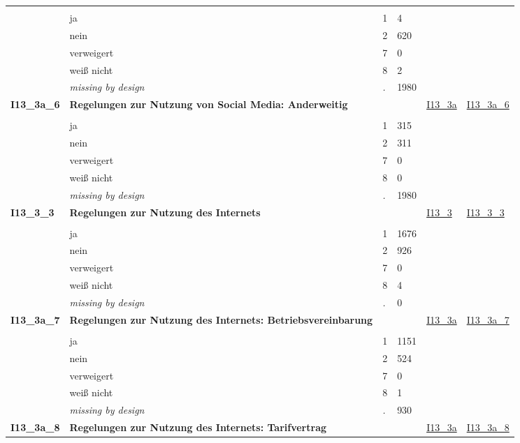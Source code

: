 \begin{longtable}{| L{2.45cm} | L{6cm} | C{1.5cm} | R{1cm} | C{2.25cm} | C{2.25cm} |}
   &  &  &  &  &  \\ 
   & ja & 1 & 4 &  &  \\ 
   & nein & 2 & 620 &  &  \\ 
   & verweigert & 7 & 0 &  &  \\ 
   & weiß nicht & 8 & 2 &  &  \\ 
   & \textit{missing by design} & \textit{.} & 1980 &  &  \\ 
   \midrule
\textbf{I13\_3a\_6}\label{var:I13:3a:6} & \textbf{Regelungen zur Nutzung von Social Media: Anderweitig} &  &  & \hyperref[I13:3a]{I13\_3a} & \hyperref[var:suf:I13:3a:6]{I13\_3a\_6} \\ 
   &  &  &  &  &  \\ 
   & ja & 1 & 315 &  &  \\ 
   & nein & 2 & 311 &  &  \\ 
   & verweigert & 7 & 0 &  &  \\ 
   & weiß nicht & 8 & 0 &  &  \\ 
   & \textit{missing by design} & \textit{.} & 1980 &  &  \\ 
   \midrule
\textbf{I13\_3\_3}\label{var:I13:3:3} & \textbf{Regelungen zur Nutzung des Internets} &  &  & \hyperref[I13:3]{I13\_3} & \hyperref[var:suf:I13:3:3]{I13\_3\_3} \\ 
   &  &  &  &  &  \\ 
   & ja & 1 & 1676 &  &  \\ 
   & nein & 2 & 926 &  &  \\ 
   & verweigert & 7 & 0 &  &  \\ 
   & weiß nicht & 8 & 4 &  &  \\ 
   & \textit{missing by design} & \textit{.} & 0 &  &  \\ 
   \midrule
\textbf{I13\_3a\_7}\label{var:I13:3a:7} & \textbf{Regelungen zur Nutzung des Internets: Betriebsvereinbarung} &  &  & \hyperref[I13:3a]{I13\_3a} & \hyperref[var:suf:I13:3a:7]{I13\_3a\_7} \\ 
   &  &  &  &  &  \\ 
   & ja & 1 & 1151 &  &  \\ 
   & nein & 2 & 524 &  &  \\ 
   & verweigert & 7 & 0 &  &  \\ 
   & weiß nicht & 8 & 1 &  &  \\ 
   & \textit{missing by design} & \textit{.} & 930 &  &  \\ 
   \midrule
\textbf{I13\_3a\_8}\label{var:I13:3a:8} & \textbf{Regelungen zur Nutzung des Internets: Tarifvertrag} &  &  & \hyperref[I13:3a]{I13\_3a} & \hyperref[var:suf:I13:3a:8]{I13\_3a\_8} \\ 

\end{longtable}
